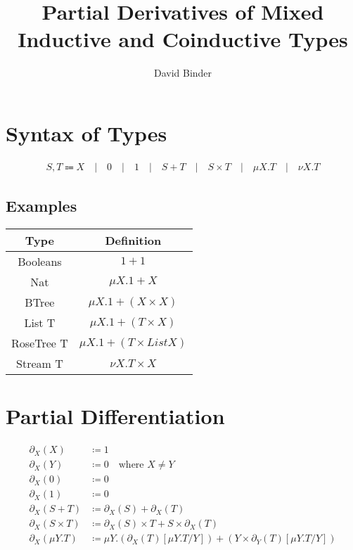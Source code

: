 \documentclass{article}
\author{David Binder}
\title{Partial Derivatives of Mixed Inductive and Coinductive Types}
\newcommand{\sep}{\quad | \quad}
\begin{document}
\maketitle

\section{Syntax of Types}

\begin{align*}
  S,T \Coloneqq X \sep 0 \sep 1 \sep S + T \sep S \times T \sep \mu X.T \sep \nu X.T
\end{align*}

\subsection{Examples}

\begin{center}
  \begin{tabular}{cc}
    \toprule
    Type & Definition \\
    \midrule
    Booleans & $1 + 1$ \\
    Nat & $\mu X. 1 + X$ \\
    BTree & $\mu X. 1 + (X \times X)$ \\
    List T & $\mu X.1 + (T \times X)$ \\
    RoseTree T & $\mu X. 1 + (T \times List X)$ \\
    Stream T & $\nu X. T \times X$ \\
    \bottomrule
  \end{tabular}
\end{center}

\section{Partial Differentiation}

\begin{align*}
  \partial_X(X) &\coloneqq 1 \\
  \partial_X(Y) &\coloneqq 0 \quad \text{where $X \neq Y$} \\
  \partial_X(0) &\coloneqq 0 \\
  \partial_X(1) &\coloneqq 0 \\
  \partial_X(S + T) &\coloneqq \partial_X(S) + \partial_X(T) \\
  \partial_X(S \times T) &\coloneqq \partial_X(S)\times T + S \times \partial_X(T) \\
  \partial_X(\mu Y.T) &\coloneqq \mu Y. (\partial_X(T)[\mu Y.T / Y]) + (Y \times \partial_Y(T)[\mu Y.T / Y])
\end{align*}
\end{document}
